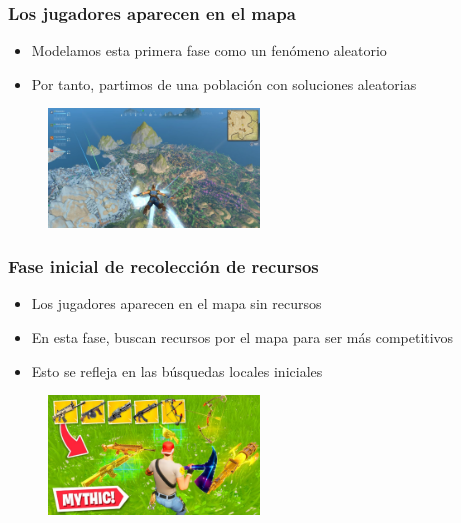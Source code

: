 \documentclass{beamer}
\begin{document}
\begin{frame}
    \frametitle{Los jugadores aparecen en el mapa}

    \begin{itemize}
        \item Modelamos esta primera fase como un fenómeno aleatorio
        \item Por tanto, partimos de una población con soluciones aleatorias
    \end{itemize}

    \begin{figure}
        \centering
        \includegraphics[width=0.5\textwidth]{jumping}
    \end{figure}
\end{frame}

\begin{frame}
    \frametitle{Fase inicial de recolección de recursos}

    \begin{itemize}
        \item Los jugadores aparecen en el mapa sin recursos
        \item En esta fase, buscan recursos por el mapa para ser más competitivos
        \item Esto se refleja en las búsquedas locales iniciales
    \end{itemize}

    \begin{figure}
        \centering
        \includegraphics[width=0.5\textwidth]{resources}
    \end{figure}
\end{frame}
\end{document}
